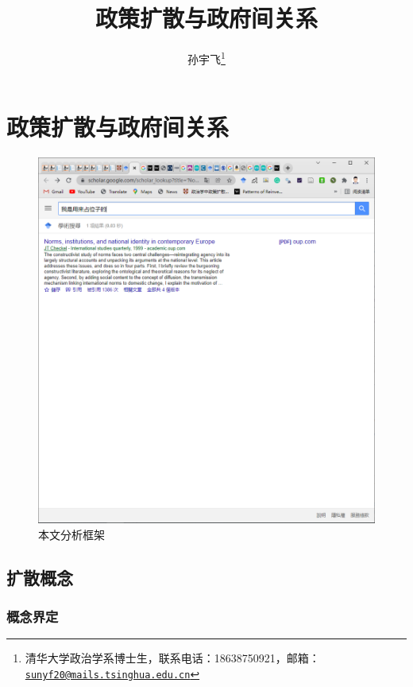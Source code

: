 \documentclass[
  12pt,
]{ctexart}
\title{政策扩散与政府间关系}
\author{孙宇飞\footnote{清华大学政治学系博士生，联系电话：18638750921，邮箱：\href{mailto:sunyf20@mails.tsinghua.edu.cn}{\nolinkurl{sunyf20@mails.tsinghua.edu.cn}}}}
\date{}
\begin{document}
\maketitle

\hypertarget{ux653fux7b56ux6269ux6563ux4e0eux653fux5e9cux95f4ux5173ux7cfb}{%
\section{政策扩散与政府间关系}\label{ux653fux7b56ux6269ux6563ux4e0eux653fux5e9cux95f4ux5173ux7cfb}}

\begin{figure}
\includegraphics[width=1\linewidth]{../figures/分析框架} \caption{本文分析框架}\label{fig:unnamed-chunk-1}
\end{figure}

\hypertarget{ux6269ux6563ux6982ux5ff5}{%
\subsection{扩散概念}\label{ux6269ux6563ux6982ux5ff5}}

\hypertarget{ux6982ux5ff5ux754cux5b9a}{%
\subsubsection{概念界定}\label{ux6982ux5ff5ux754cux5b9a}}
\end{document}
